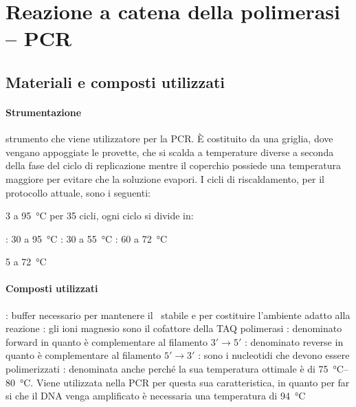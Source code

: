 \section{Reazione a catena della polimerasi -- PCR}

\subsection{Materiali e composti utilizzati}
\paragraph{Strumentazione}
\begin{itemize}[person]
	\itemb[Termociclatore:]\label{it:termociclatore} strumento che viene utilizzatore per la PCR. È costituito da una griglia, dove vengano appoggiate le provette, che si scalda a temperature diverse a seconda della fase del ciclo di replicazione mentre il coperchio possiede una temperatura maggiore per evitare che la soluzione evapori.
	I cicli di riscaldamento, per il protocollo attuale, sono i seguenti:
	\begin{itemize}[squareItem]
		 \qty{3}{\min} a \qty{95}{\celsius}
		\itemb[Amplificazione] per 35 cicli, ogni ciclo si divide in:
		\begin{itemize}[squareItem]
			\itemb[Denaturazione]: \qty{30}{\sec} a \qty{95}{\celsius}
			\itemb[Ibridazione]: \qty{30}{\sec} a \qty{55}{\celsius}
			\itemb[Estensione]: \qty{60}{\sec} a \qty{72}{\celsius}
		\end{itemize}
		 \qty{5}{\min} a \qty{72}{\celsius}
	\end{itemize}
\end{itemize}

\paragraph{Composti utilizzati}
\begin{itemize}[person]
	: buffer necessario per mantenere il \pH\ stabile e per costituire l'ambiente adatto alla reazione
	\itemb[\ch{MgCl2}]: gli ioni magnesio  sono il cofattore della TAQ polimerasi
	: denominato \foreignlanguage{english}{forward} in quanto è complementare al filamento \(3' \rightarrow 5'\)
	: denominato \foreignlanguage{english}{reverse} in quanto è complementare al filamento \(5' \rightarrow 3'\)
	: sono i nucleotidi che devono essere polimerizzati
	: denominata anche  perché la sua temperatura ottimale è di \qtyrange{75}{80}{\celsius}. Viene utilizzata nella PCR per questa sua caratteristica, in quanto per far si che il DNA venga amplificato è necessaria una temperatura di \qty{94}{\celsius}
\end{itemize}

